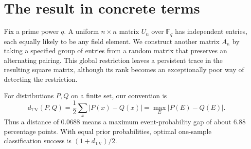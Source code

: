 \documentclass[11pt]{article}
\newcommand{\F}{\mathbb F_q}
\newcommand{\Sp}{\operatorname{Sp}}
\newcommand{\TV}{d_{\mathrm{TV}}}
\newcommand{\rad}{\operatorname{rad}}
\newcommand{\Mat}{\operatorname{Mat}}
\newcommand{\1}{\mathbf 1}
\theoremstyle{definition}
\theoremstyle{remark}
\numberwithin{equation}{section}
\begin{document}
\begin{abstract}
Let $X_0$ be an injective $2n\times n$ matrix over $\F$, with alternating Gram matrix $H$, and let $A$ be the upper half of $gX_0$ for uniform $g\in\Sp_{2n}(\F)$. We determine the likelihood of every $A$ relative to the uniform law on $\Mat_n(\F)$ in terms of $k=\dim\ker A$, $t=\dim(\ker A\cap\rad H)$, and whether $\ker A$ is $H$-isotropic. For nonsingular $H$, $n$ is even and the likelihood is $q^{\binom{k}{2}}/\prod_{j=n/2+1}^n(1-q^{-2j})$ on the isotropic-kernel locus and zero elsewhere. The total variation distance of the nullity laws has an exact formula of order $q^{-n}$, whereas the distance of the full matrix laws converges to an explicit positive constant. A kernel-isotropy test is exactly optimal at every finite dimension. The formulas hold in characteristic two. Exact rational evaluation and independent exhaustive enumeration accompany the proof. The work answers a concrete part of the arbitrary-subspace question raised by the supplied ProveIt symplectic-block report.
\end{abstract}
\tableofcontents
\newpage
{}

\section{The result in concrete terms}
Fix a prime power $q$. A uniform $n\times n$ matrix $U_n$ over $\F$ has independent entries, each equally likely to be any field element. We construct another matrix $A_n$ by taking a specified group of entries from a random matrix that preserves an alternating pairing. This global restriction leaves a persistent trace in the resulting square matrix, although its rank becomes an exceptionally poor way of detecting the restriction.

For distributions $P,Q$ on a finite set, our convention is
\[
\TV(P,Q)=\frac12\sum_x|P(x)-Q(x)|
 =\max_E|P(E)-Q(E)|.
\]
Thus a distance of $0.0688$ means a maximum event-probability gap of about $6.88$ percentage points. With equal prior probabilities, optimal one-sample classification success is $(1+\TV)/2$.
\end{document}
